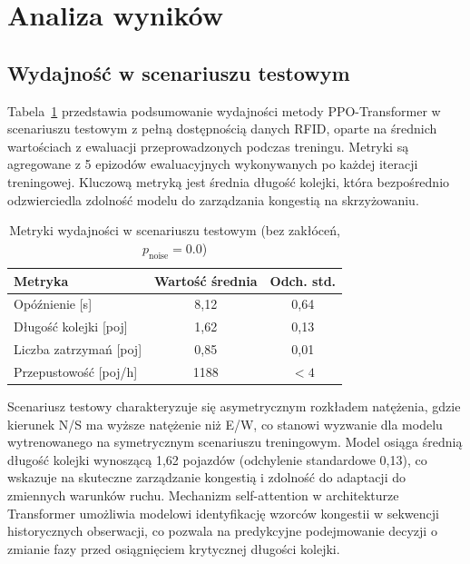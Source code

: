\documentclass[10pt,a4paper]{article}
\begin{document}
\section{Analiza wyników}

\subsection{Wydajność w scenariuszu testowym}

Tabela~\ref{tab:4} przedstawia podsumowanie wydajności metody PPO-Transformer w scenariuszu testowym z pełną dostępnością danych RFID, oparte na średnich wartościach z ewaluacji przeprowadzonych podczas treningu. Metryki są agregowane z 5 epizodów ewaluacyjnych wykonywanych po każdej iteracji treningowej. Kluczową metryką jest średnia długość kolejki, która bezpośrednio odzwierciedla zdolność modelu do zarządzania kongestią na skrzyżowaniu.

\begin{table}[H]
\centering
\footnotesize
\caption{Metryki wydajności w scenariuszu testowym (bez zakłóceń, $p_{\text{noise}} = 0.0$)}
\label{tab:4}
\begin{tabular}{lcc}
\toprule
Metryka & Wartość średnia & Odch. std. \\
\midrule
Opóźnienie [s] & 8,12 & 0,64 \\
Długość kolejki [poj] & 1,62 & 0,13 \\
Liczba zatrzymań [poj] & 0,85 & 0,01 \\
Przepustowość [poj/h] & 1188 & $<4$ \\
\bottomrule
\end{tabular}
\end{table}

Scenariusz testowy charakteryzuje się asymetrycznym rozkładem natężenia, gdzie kierunek N/S ma wyższe natężenie niż E/W, co stanowi wyzwanie dla modelu wytrenowanego na symetrycznym scenariuszu treningowym. Model osiąga średnią długość kolejki wynoszącą 1,62 pojazdów (odchylenie standardowe 0,13), co wskazuje na skuteczne zarządzanie kongestią i zdolność do adaptacji do zmiennych warunków ruchu. Mechanizm self-attention w architekturze Transformer umożliwia modelowi identyfikację wzorców kongestii w sekwencji historycznych obserwacji, co pozwala na predykcyjne podejmowanie decyzji o zmianie fazy przed osiągnięciem krytycznej długości kolejki.
\end{document}
